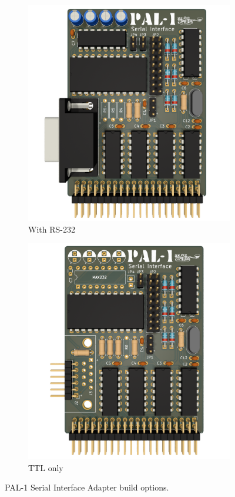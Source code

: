 \documentclass[a4paper,11pt,twoside,openright]{report}
\begin{document}
\begin{figure}[!tbp]
  \begin{subfigure}[b]{0.45\textwidth}
    \includegraphics[width=\textwidth]{figures/serial-alt-1.png}
    \caption{With RS-232}
  \end{subfigure}
  \hfill
  \begin{subfigure}[b]{0.45\textwidth}
    \includegraphics[width=\textwidth]{figures/serial-alt-2.png}
    \caption{TTL only}
  \end{subfigure}
  \caption{PAL-1 Serial Interface Adapter build options.}
  \label{fig:alternatives}
\end{figure}
\end{document}

